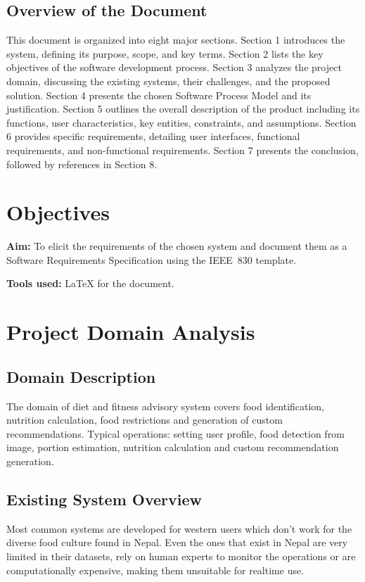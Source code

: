\documentclass[11pt,a4paper]{article}
\begin{document}
\subsection{Overview of the Document}
This document is organized into eight major sections. Section 1 introduces the system, defining its purpose, scope, and key terms. Section 2 lists the key objectives of the software development process. Section 3 analyzes the project domain, discussing the existing systems, their challenges, and the proposed solution. Section 4 presents the chosen Software Process Model and its justification. Section 5 outlines the overall description of the product including its functions, user characteristics, key entities, constraints, and assumptions. Section 6 provides specific requirements, detailing user interfaces, functional requirements, and non-functional requirements. Section 7 presents the conclusion, followed by references in Section 8.

\section{Objectives}
\textbf{Aim:} To elicit the requirements of the chosen system and document them as a Software Requirements Specification using the IEEE~830 template.

\textbf{Tools used:} \LaTeX{} for the document.


\section{Project Domain Analysis}

\subsection{Domain Description}
The domain of diet and fitness advisory system covers food identification, nutrition calculation, food
restrictions and generation of custom recommendations. Typical operations: setting user profile,
food detection from image, portion estimation, nutrition calculation and custom recommendation
generation.

\subsection{Existing System Overview}
Most common systems are developed for western users which don’t work for the diverse food culture
found in Nepal. Even the ones that exist in Nepal are very limited in their datasets, rely on human
experts to monitor the operations or are computationally expensive, making them unsuitable for
realtime use.
\end{document}
